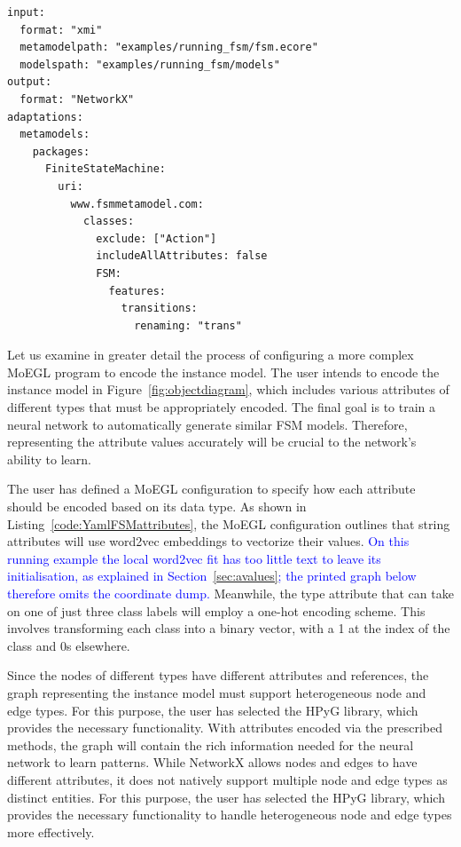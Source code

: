 \documentclass[journal,article,submit,moreauthors,technologies]{Definitions/mdpi}
\newcommand{\rev}[1]{\textcolor{blue}{#1}}
\begin{document}
\begin{program_}[H]
\footnotesize
\begin{verbatim}
input:
  format: "xmi"
  metamodelpath: "examples/running_fsm/fsm.ecore"
  modelspath: "examples/running_fsm/models"
output:
  format: "NetworkX"
adaptations:
  metamodels:
    packages:
      FiniteStateMachine:
        uri:
          www.fsmmetamodel.com:
            classes:
              exclude: ["Action"]
              includeAllAttributes: false
              FSM:
                features:
                  transitions:
                    renaming: "trans"
\end{verbatim}
\caption{\rev{The configuration that produces Matrix~\ref{mat:matrix}. The class key is the EClass name \texttt{FSM}.}}
\label{code:YamlFSM}
\end{program_}

Let us examine in greater detail the process of configuring a more complex MoEGL program to encode the instance model. The user intends to encode the instance model in Figure~\ref{fig:objectdiagram}, which includes various attributes of different types that must be appropriately encoded. The final goal is to train a neural network to automatically generate similar FSM models. Therefore, representing the attribute values accurately will be crucial to the network's ability to learn.

The user has defined a MoEGL configuration to specify how each attribute should be encoded based on its data type. As shown in Listing~\ref{code:YamlFSMattributes}, the MoEGL configuration outlines that string attributes will use word2vec embeddings to vectorize their values. \rev{On this running example the local word2vec fit has too little text to leave its initialisation, as explained in Section~\ref{sec:avalues}; the printed graph below therefore omits the coordinate dump.} Meanwhile, the type attribute that can take on one of just three class labels will employ a one-hot encoding scheme. This involves transforming each class into a binary vector, with a 1 at the index of the class and 0s elsewhere.

Since the nodes of different types have different attributes and references, the graph representing the instance model must support heterogeneous node and edge types. For this purpose, the user has selected the HPyG library, which provides the necessary functionality. With attributes encoded via the prescribed methods, the graph will contain the rich information needed for the neural network to learn patterns. While NetworkX allows nodes and edges to have different attributes, it does not natively support multiple node and edge types as distinct entities. For this purpose, the user has selected the HPyG library, which provides the necessary functionality to handle heterogeneous node and edge types more effectively.
\end{document}
